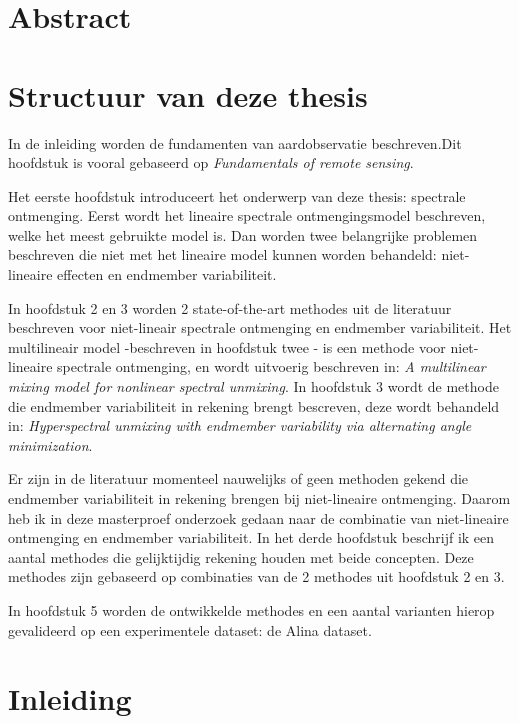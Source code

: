 \documentclass[12pt]{report}
\begin{document}
\newpage
\chapter*{Abstract}



\newpage
\chapter*{Structuur van deze thesis}
 In de inleiding worden de fundamenten van aardobservatie beschreven.Dit hoofdstuk is vooral gebaseerd op 
\textit{Fundamentals of remote sensing\cite{fun}}.

Het eerste hoofdstuk introduceert het onderwerp van deze thesis: spectrale ontmenging. Eerst wordt het lineaire spectrale ontmengingsmodel beschreven, welke het meest gebruikte model is. Dan worden twee belangrijke problemen beschreven die niet met het lineaire model kunnen worden behandeld: niet-lineaire effecten en endmember variabiliteit.

In hoofdstuk 2 en 3 worden 2 state-of-the-art methodes uit de literatuur beschreven voor niet-lineair spectrale ontmenging en endmember variabiliteit.  Het multilineair model -beschreven in hoofdstuk twee - is een methode voor niet-lineaire spectrale ontmenging, en wordt uitvoerig beschreven in: \textit{A multilinear mixing model for nonlinear spectral unmixing}\cite{mlinmix}. In hoofdstuk 3 wordt de methode die endmember variabiliteit in rekening brengt bescreven, deze wordt behandeld in: \textit{Hyperspectral unmixing with endmember variability via alternating angle minimization}\cite{mesma}.

Er zijn in de literatuur momenteel nauwelijks of geen methoden gekend die endmember variabiliteit in rekening brengen bij niet-lineaire ontmenging. Daarom heb ik in deze masterproef onderzoek gedaan naar de combinatie van niet-lineaire ontmenging en endmember variabiliteit. In het derde hoofdstuk beschrijf ik een aantal methodes die gelijktijdig rekening houden met beide concepten. Deze methodes zijn gebaseerd op combinaties van de 2 methodes uit hoofdstuk 2 en 3.
	
In hoofdstuk 5 worden de ontwikkelde methodes en een aantal varianten hierop gevalideerd  op een experimentele dataset: de Alina dataset\cite{Alina}.  
\newpage
\chapter*{Inleiding}
\end{document}
